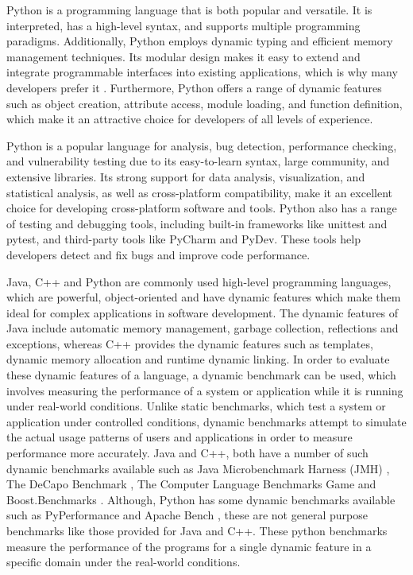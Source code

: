 Python is a programming language that is both popular and versatile. It is interpreted, has a high-level syntax, and supports multiple programming paradigms. Additionally, Python employs dynamic typing and efficient memory management techniques. Its modular design makes it easy to extend and integrate programmable interfaces into existing applications, which is why many developers prefer it \cite{Python_language_wiki}. Furthermore, Python offers a range of dynamic features such as object creation, attribute access, module loading, and function definition, which make it an attractive choice for developers of all levels of experience.

Python is a popular language for analysis, bug detection, performance checking, and vulnerability testing due to its easy-to-learn syntax, large community, and extensive libraries. Its strong support for data analysis, visualization, and statistical analysis, as well as cross-platform compatibility, make it an excellent choice for developing cross-platform software and tools. Python also has a range of testing and debugging tools, including built-in frameworks like unittest and pytest, and third-party tools like PyCharm and PyDev. These tools help developers detect and fix bugs and improve code performance.

Java, C++ and Python are commonly used high-level programming languages, which are powerful, object-oriented and have dynamic features which make them ideal for complex applications in software development. The dynamic features of Java include automatic memory management, garbage collection, reflections and exceptions, whereas C++ provides the dynamic features such as templates, dynamic memory allocation and runtime dynamic linking. In order to evaluate these dynamic features of a language, a dynamic benchmark can be used, which involves measuring the performance of a system or application while it is running under real-world conditions.  Unlike static benchmarks, which test a system or application under controlled conditions, dynamic benchmarks attempt to simulate the actual usage patterns of users and applications in order to measure performance more accurately. Java and C++, both have a number of such dynamic benchmarks available such as Java Microbenchmark Harness (JMH) \cite{JMH}, The DeCapo Benchmark \cite{DaCapo_2006}, The Computer Language Benchmarks Game \cite{C++_Benchmark1} and Boost.Benchmarks \cite{Boost_Benchmarks}. Although, Python has some dynamic benchmarks available such as PyPerformance \cite{PyPerformance} and Apache Bench \cite{Apache_Benchmark}, these are not general purpose benchmarks like those provided for Java and C++. These python benchmarks measure the performance of the programs for a single dynamic feature in a specific domain under the real-world conditions.

